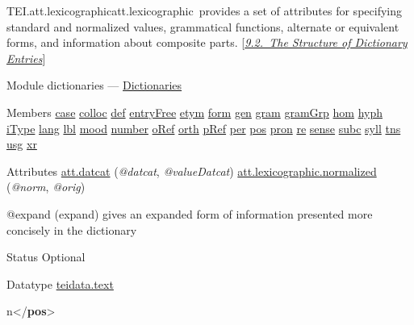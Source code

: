 \begin{reflist}
\item[]\begin{specHead}{TEI.att.lexicographic}{att.lexicographic} provides a set of attributes for specifying standard and normalized values, grammatical functions, alternate or equivalent forms, and information about composite parts. [\textit{\hyperref[DIEN]{9.2.\ The Structure of Dictionary Entries}}]\end{specHead} 
    \item[{Module}]
  dictionaries — \hyperref[DI]{Dictionaries}
    \item[{Members}]
  \hyperref[TEI.case]{case} \hyperref[TEI.colloc]{colloc} \hyperref[TEI.def]{def} \hyperref[TEI.entryFree]{entryFree} \hyperref[TEI.etym]{etym} \hyperref[TEI.form]{form} \hyperref[TEI.gen]{gen} \hyperref[TEI.gram]{gram} \hyperref[TEI.gramGrp]{gramGrp} \hyperref[TEI.hom]{hom} \hyperref[TEI.hyph]{hyph} \hyperref[TEI.iType]{iType} \hyperref[TEI.lang]{lang} \hyperref[TEI.lbl]{lbl} \hyperref[TEI.mood]{mood} \hyperref[TEI.number]{number} \hyperref[TEI.oRef]{oRef} \hyperref[TEI.orth]{orth} \hyperref[TEI.pRef]{pRef} \hyperref[TEI.per]{per} \hyperref[TEI.pos]{pos} \hyperref[TEI.pron]{pron} \hyperref[TEI.re]{re} \hyperref[TEI.sense]{sense} \hyperref[TEI.subc]{subc} \hyperref[TEI.syll]{syll} \hyperref[TEI.tns]{tns} \hyperref[TEI.usg]{usg} \hyperref[TEI.xr]{xr}
    \item[{Attributes}]
  \hyperref[TEI.att.datcat]{att.datcat} (\textit{@datcat}, \textit{@valueDatcat}) \hyperref[TEI.att.lexicographic.normalized]{att.lexicographic.normalized} (\textit{@norm}, \textit{@orig}) \hfil\\[-10pt]\begin{sansreflist}
    \item[@expand]
  (expand) gives an expanded form of information presented more concisely in the dictionary
\begin{reflist}
    \item[{Status}]
  Optional
    \item[{Datatype}]
  \hyperref[TEI.teidata.text]{teidata.text}
    \item[]\mbox{}\newline 
{}n{</\textbf{pos}>}\mbox{}\newline 

\end{reflist}
\end{sansreflist}
\end{reflist}
